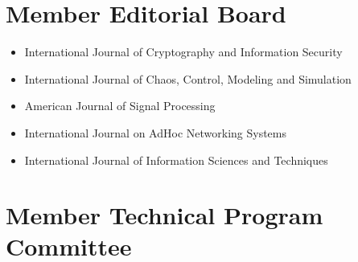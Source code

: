 \documentclass[11pt,a4paper,sans]{moderncv}   %
\begin{document}
\section{Member Editorial Board}
\begin{itemize}
\item International Journal of Cryptography and Information Security
\item International Journal of Chaos, Control, Modeling and Simulation
\item American Journal of Signal Processing
\item International Journal on AdHoc Networking Systems
\item International Journal of Information Sciences and Techniques
\end{itemize}

\section{Member Technical Program Committee}
\end{document}
